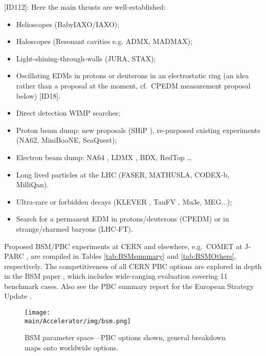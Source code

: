  [ID112]: Here the main thrusts are well-established:
\begin{itemize}
\item	Helioscopes (BabyIAXO/IAXO);
\item	Haloscopes (Resonant cavities e.g. ADMX, MADMAX);
\item Light-shining-through-walls (JURA, STAX);
\item Oscillating EDMs in protons or deuterons in an electrostatic ring (an idea rather than a proposal at the moment, cf.\ CPEDM measurement proposal below) [ID18].
\end{itemize}

\begin{itemize}
\item	Direct detection WIMP searches;
\item	Proton beam dump: new proposals (SHiP \cite{id12,id129}), re-purposed existing experiments (NA62, MiniBooNE, SeaQuest);
\item	Electron beam dump: NA64 \cite{id9}, LDMX \cite{id36}, BDX, RedTop 
\cite{id28} \ldots  
\item	Long lived particles at the LHC (FASER, MATHUSLA, CODEX-b, MilliQan).
\end{itemize}

\begin{itemize}
\item Ultra-rare or forbidden decays (KLEVER \cite{id153}, TauFV \cite{id102}, Mu3e, MEG...);
\item Search for a permanent EDM in protons/deuterons (CPEDM) or in strange/charmed baryons (LHC-FT).
\end{itemize}

Proposed BSM/PBC experiments at CERN and elsewhere, e.g.~COMET at J-PARC \cite{id38}, are compiled in Tables \ref{tab:BSMsummary} and \ref{tab:BSMOthers}, 
 respectively. The competitiveness of all CERN PBC options are explored in depth in the BSM paper \cite{Alemany:2019vsk}, which includes wide-ranging evaluation covering 11 benchmark cases. Also see the PBC summary report for the European Strategy Update \cite{id20}.

 \begin{figure}[t]
 \centering
 \texttt{[image: \\main/Accelerator/img/bsm.png]}
\caption{BSM parameter space---PBC options shown, general breakdown maps onto worldwide options.}
\label{fig:bsm}
\end{figure}

